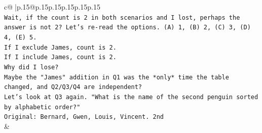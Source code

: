 \documentclass{article}
\begin{document}
{\begin{supertabular}{c@{$\;$}|p{.15\linewidth}@{}p{.15\linewidth}p{.15\linewidth}p{.15\linewidth}p{.15\linewidth}p{.15\linewidth}}
{{{\\ 
\texttt{Wait, if the count is 2 in both scenarios and I lost, perhaps the answer is not 2? Let's re{-}read the options. (A) 1, (B) 2, (C) 3, (D) 4, (E) 5.} \\
\texttt{If I exclude James, count is 2.} \\
\texttt{If I include James, count is 2.} \\
\texttt{Why did I lose?} \\
\texttt{Maybe the "James" addition in Q1 was the *only* time the table changed, and Q2/Q3/Q4 are independent?} \\
\texttt{Let's look at Q3 again. "What is the name of the second penguin sorted by alphabetic order?"} \\
\texttt{Original: Bernard, Gwen, Louis, Vincent. 2nd} \\
            }
        }
    }
    & \\ \\

\end{supertabular}
}
\end{document}
